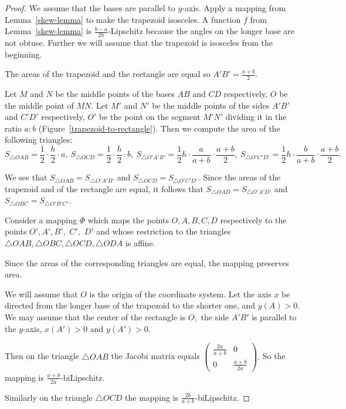 \documentclass[12pt]{article}
\theoremstyle{definition}
\begin{document}
\begin{proof}
We assume that the bases are parallel to $y$-axis. Apply a mapping from Lemma~\ref{skew-lemma} to make the trapezoid isosceles. A function $f$ from Lemma~\ref{skew-lemma} is $\frac{b-a}{2h}$-Lipschitz because the angles on the longer base are not obtuse. Further we will assume that the trapezoid is isosceles from the beginning.

The areas of the trapezoid and the rectangle are equal so $A'B' = \frac{a+b}2.$

Let $M$ and $N$ be the middle points of the bases $AB$ and $CD$ respectively, $O$ be the middle point of $MN$. Let $M'$ and $N'$ be the middle points of the sides $A'B'$ and $C'D'$ respectively, $O'$ be the point on the segment $M'N'$ dividing it in the ratio $a:b$ (Figure~\ref{trapezoid-to-rectangle}). Then we compute the area of the following triangles:
$$
S_{\triangle OAB} = \frac12\cdot\frac{h}2\cdot a,\ 
S_{\triangle OCD} = \frac12\cdot\frac{h}2\cdot b,\ 
S_{\triangle O'A'B'} = \frac12h\cdot\frac{a}{a+b}\cdot\frac{a+b}2,\ 
S_{\triangle O'C'D'} = \frac12h\cdot\frac{b}{a+b}\cdot\frac{a+b}2.
$$

We see that $S_{\triangle OAB} = S_{\triangle O'A'B'}$ and $S_{\triangle OCD} = S_{\triangle O'C'D'}.$ Since the areas of the trapezoid and of the rectangle are equal, it follows that
$S_{\triangle OAD} = S_{\triangle O'A'D'}$ and $S_{\triangle OBC} = S_{\triangle O'B'C'}.$

Consider a mapping $\Phi$ which maps the points $O,A,B,C,D$ respectively to the points $O', A',B',$ $C',$ $D'$ and whose restriction to the triangles $\triangle OAB, \triangle OBC, \triangle OCD, \triangle ODA$ is affine.

Since the areas of the corresponding triangles are equal, the mapping preserves area.

We will assume that $O$ is the origin of the coordinate system. Let the axis $x$ be directed from the longer base of the trapezoid to the shorter one, and $y(A)>0.$ We may assume that the center of the rectangle is $O,$ the side $A'B'$ is parallel to the $y$-axis, $x(A')>0$ and $y(A')>0.$

Then on the triangle $\triangle OAB$ the Jacobi matrix equals $\begin{pmatrix}\frac{2a}{a+b} & 0\\ 0& \frac{a+b}{2a}\end{pmatrix}.$ So the mapping is $\frac{a+b}{2a}$-biLipschitz.

Similarly on the triangle $\triangle OCD$ the mapping is $\frac{2b}{a+b}$-biLipschitz.


\end{proof}
\end{document}
